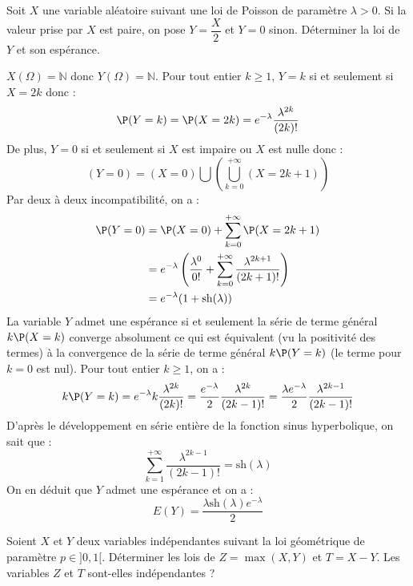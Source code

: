 \documentclass[a4paper,10pt]{report}
\begin{document}
\begin{Exa} Soit $X$ une variable aléatoire suivant une loi de Poisson de paramètre $\lambda>0$. Si la valeur prise par $X$ est paire, on pose $Y = \dfrac{X}{2}$ et $Y=0$ sinon. Déterminer la loi de $Y$ et son espérance.
\end{Exa}

\corr $X(\Omega) = \mathbb{N}$ donc $Y(\Omega)= \mathbb{N}$. Pour tout entier $k \geq 1$, $Y=k$ si et seulement si $X=2k$ donc :
$$ \P(Y=k) = \P(X=2k) = e^{- \lambda} \dfrac{\lambda^{2k}}{(2k)!}$$
De plus, $Y=0$ si et seulement si $X$ est impaire ou $X$ est nulle donc :
$$ (Y=0) = (X=0) \bigcup \left( \bigcup_{k=0}^{+ \infty} (X=2k+1) \right)$$
Par deux à deux incompatibilité, on a :
\begin{align*}
\P(Y=0) & = \P(X=0) + \sum_{k=0}^{+ \infty} \P(X=2k+1) \\
& = e^{- \lambda} \left( \dfrac{\lambda^0}{0!} + \sum_{k=0}^{+ \infty} \dfrac{\lambda^{2k+1}}{(2k+1)!} \right) \\
& = e^{- \lambda}( 1 + \textrm{sh}(\lambda))
\end{align*}
La variable $Y$ admet une espérance si et seulement la série de terme général $k \P(X=k)$ converge absolument ce qui est équivalent (vu la positivité des termes) à la convergence de la série de terme général $k\P(Y=k)$ (le terme pour $k=0$ est nul).  Pour tout entier $k \geq 1$, on a :
$$ k \P(Y=k) = e^{- \lambda} k \dfrac{\lambda^{2k}}{(2k)!} =\dfrac{e^{-\lambda}}{2} \dfrac{\lambda^{2k}}{(2k-1)!} = \dfrac{ \lambda e^{-\lambda}}{2} \dfrac{\lambda^{2k-1}}{(2k-1)!}$$
D'après le développement en série entière de la fonction sinus hyperbolique, on sait que :
$$ \sum_{k=1}^{+ \infty}  \dfrac{\lambda^{2k-1}}{(2k-1)!} = \textrm{sh}(\lambda)$$
On en déduit que $Y$ admet une espérance et on a :
$$ E(Y) = \dfrac{ \lambda \textrm{sh}(\lambda) e^{-\lambda}}{2}$$

\begin{Exa} Soient $X$ et $Y$ deux variables indépendantes suivant la loi géométrique de paramètre $p \in ]0,1[$. Déterminer les lois de $Z= \max(X,Y)$ et $T=X-Y$. Les variables $Z$ et $T$ sont-elles indépendantes ?
\end{Exa}
\end{document}
